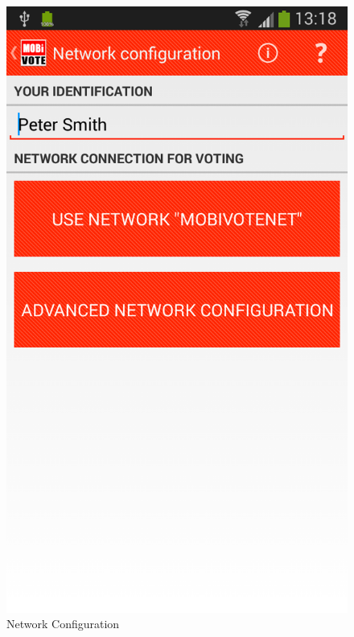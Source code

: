 \documentclass[numbers=noenddot, abstract=on, a4paper, headsepline,
footsepline, oneside, draft=off]{scrreprt}
\begin{document}
\begin{figure}[!htb]
	\begin{minipage}{.5\textwidth}
  		\centering
		\includegraphics[height=.4\textheight]{img/screenshots/network_configuration}
		\caption{Network Configuration}
		\label{fig:handbook_networkconfiguration}
	\end{minipage}
	\begin{minipage}{.5\textwidth}
  		\centering

\end{minipage}
\end{figure}
\end{document}

